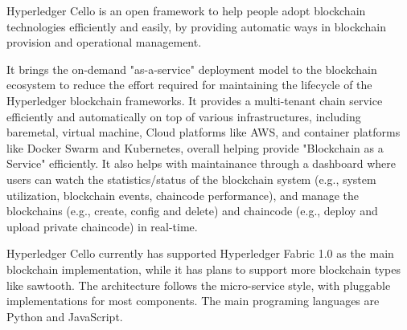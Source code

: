 Hyperledger Cello is an open framework to help people adopt blockchain technologies efficiently and easily, by providing automatic ways in blockchain provision and operational management. 

It brings the on-demand "as-a-service" deployment model to the blockchain ecosystem to reduce the effort required for maintaining the lifecycle of the Hyperledger blockchain frameworks. It provides a multi-tenant chain service efficiently and automatically on top of various infrastructures, including baremetal, virtual machine, Cloud platforms like AWS, and container platforms like Docker Swarm and Kubernetes, overall helping provide "Blockchain as a Service" efficiently. It also helps with maintainance through a dashboard where users can watch the statistics/status of the blockchain system (e.g., system utilization, blockchain events, chaincode performance), and manage the blockchains (e.g., create, config and delete) and chaincode (e.g., deploy and upload private chaincode) in real-time.

Hyperledger Cello currently has supported Hyperledger Fabric 1.0 as the main blockchain implementation, while it has plans to support more blockchain types like sawtooth. The architecture follows the micro-service style, with pluggable implementations for most components. The main programing languages are Python and JavaScript.
